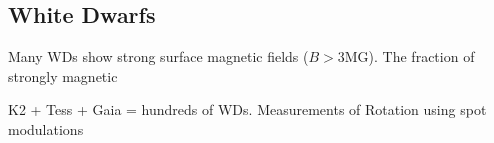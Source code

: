 {\color{red} \subsection{White Dwarfs}}
Many WDs show strong surface magnetic fields ($B>$3MG). The fraction of strongly magnetic  

K2 + Tess + Gaia = hundreds of WDs. Measurements of Rotation using spot modulations